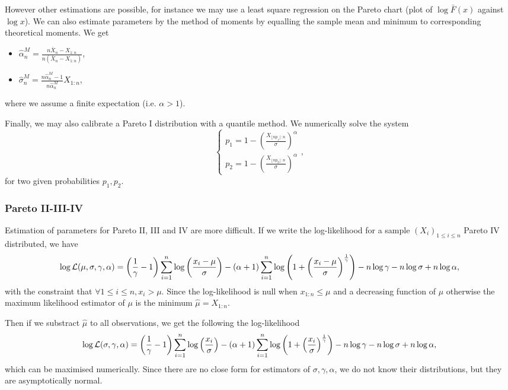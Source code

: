 However other estimations are possible, for instance we may use a least square regression on the Pareto chart (plot of $\log \bar F(x)$ against $\log x$). We can also estimate parameters by the method of moments by equalling the sample mean and minimum to corresponding theoretical moments. We get
\begin{itemize}
\item $\hat \alpha_n^M = \frac{n \bar X_n - X_{1:n}}{n (\bar X_n - X_{1:n})}$,
\item $\hat \sigma_n^M = \frac{n\hat \alpha_n^M-1}{n\hat \alpha_n^M} X_{1:n}$,
\end{itemize}
where we assume a finite expectation (i.e. $\alpha>1$).

Finally, we may also calibrate a Pareto I distribution with a quantile method. We numerically solve the system
$$
\left\{
\begin{array}{c}
p_1 = 1- \left(\frac{X_{\lfloor np_1\rfloor:n}}{\sigma}\right)^\alpha\\
p_2 = 1- \left(\frac{X_{\lfloor np_2\rfloor:n}}{\sigma}\right)^\alpha
\end{array}
\right. ,
$$
for two given probabilities $p_1, p_2$.

\subsubsection{Pareto II-III-IV}
Estimation of parameters for Pareto II, III and IV are more difficult. If we write the log-likelihood for a sample $(X_i)_{1\leq i\leq n}$ Pareto IV distributed, we have
$$
\log \mathcal L(\mu, \sigma, \gamma, \alpha) = \left(\frac{1}{\gamma}-1\right)\sum_{i=1}^n\log \left( \frac{x_i-\mu}{\sigma} \right) - (\alpha+1)\sum_{i=1}^n \log \left(1+ \left(\frac{x_i-\mu}{\sigma}\right)^{\frac{1}{\gamma}} \right) -n\log \gamma-n\log\sigma+n\log \alpha ,
$$
with the constraint that $\forall 1\leq i \leq n, x_i>\mu$. Since the log-likelihood is null when $x_{1:n}\leq\mu$ and a decreasing function of $\mu$ otherwise the maximum likelihood estimator of $\mu$ is the minimum  $\hat \mu =X_{1:n}$. 

Then if we substract $\hat \mu$ to all observations, we get the following the log-likelihood
$$
\log \mathcal L(\sigma, \gamma, \alpha) = \left(\frac{1}{\gamma}-1\right)\sum_{i=1}^n\log \left( \frac{x_i}{\sigma} \right) - (\alpha+1)\sum_{i=1}^n \log \left(1+ \left(\frac{x_i}{\sigma}\right)^{\frac{1}{\gamma}} \right) -n\log \gamma-n\log\sigma+n\log \alpha,
$$
which can be maximised numerically. Since there are no close form for estimators of $\sigma, \gamma, \alpha$, we do not know their distributions, but they are asymptotically normal.

